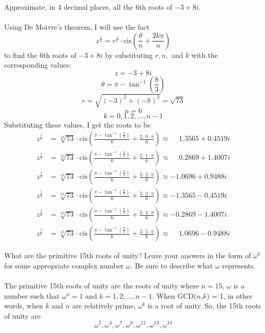 \documentclass[titlepage]{article}
\newenvironment{problem}[2][Problem]{\begin{trivlist}
\item[\hskip \labelsep {\bfseries #1}\hskip \labelsep {\bfseries #2.}]}{\end{trivlist}}
\begin{document}
\begin{problem}{3}
	 Approximate, in 4 decimal places, all the 6th roots of $-3+8i$. \\ \\
	 Using De Moivre's theorem, I will use the fact
	 $$z^{\frac{1}{n}} = r^{\frac{1}{n}}\cdot \text{cis}{\left(\frac{\theta}{n} + \frac{2k\pi}{n}\right)}$$
	 to find the 6th roots of $-3+8i$ by substituting $r,n,$ and $k$ with the corresponding values:
	 $$z=-3+8i$$
	 $$\theta = \pi - \tan^{-1}{(\frac{8}{3})} $$
	 $$r = \sqrt{(-3)^2 + (-8)^2} = \sqrt{73}$$
	 $$n = 6$$
	 $$k=0,1,2,...,n-1$$
	 Substituting these values, I get the roots to be
	\begin{align*}
		z^{\frac{1}{6}} &= \sqrt[12]{73} \cdot \text{cis}\left(\frac{\pi - \tan^{-1}\left(\frac{8}{3}\right)}{6} + \frac{2\cdot0\cdot\pi}{6} \right) \approx \phantom{-}1.3565 + 0.4519i\\
	 z^{\frac{1}{6}} &= \sqrt[12]{73} \cdot \text{cis}\left(\frac{\pi - \tan^{-1}\left(\frac{8}{3}\right)}{6} + \frac{2\cdot1\cdot\pi}{6} \right) \approx \phantom{-}0.2869 + 1.4007i
\\
	 z^{\frac{1}{6}} &= \sqrt[12]{73} \cdot \text{cis}\left(\frac{\pi - \tan^{-1}\left(\frac{8}{3}\right)}{6} + \frac{2\cdot2\cdot\pi}{6} \right) \approx -1.0696 + 0.9488i
	 \\
	 z^{\frac{1}{6}} &= \sqrt[12]{73} \cdot \text{cis}\left(\frac{\pi - \tan^{-1}\left(\frac{8}{3}\right)}{6} + \frac{2\cdot3\cdot\pi}{6} \right) \approx -1.3565 - 0.4519i
\\
	 z^{\frac{1}{6}} &= \sqrt[12]{73} \cdot \text{cis}\left(\frac{\pi - \tan^{-1}\left(\frac{8}{3}\right)}{6} + \frac{2\cdot4\cdot\pi}{6} \right) \approx -0.2869 - 1.4007i
\\
z^{\frac{1}{6}} &= \sqrt[12]{73} \cdot \text{cis}\left(\frac{\pi - \tan^{-1}\left(\frac{8}{3}\right)}{6} + \frac{2\cdot5\cdot\pi}{6} \right) \approx \phantom{-}1.0696 - 0.9488i
\end{align*}
\end{problem}

\begin{problem}{4}
	What are the primitive 15th roots of unity? Leave your answers in the form of $\omega^k$ for some appropriate complex number $\omega$. Be sure to describe what $\omega$ represents.
	\\
	\\
	The primitive 15th roots of unity are the roots of unity where $n = 15$,  $\omega$ is a number such that $\omega^{n}= 1$ and $k=1,2,...,n-1$.
	When GCD($n$,$k$) = 1, in other words, when $k$ and $n$ are relatively prime, $\omega^{k}$ is a root of unity. So, the 15th roots of unity are
	$$\omega^2, \omega^4, \omega^7, \omega^8, \omega^{11}, \omega^{13}, \omega^{14}$$
\end{problem}
\end{document}
